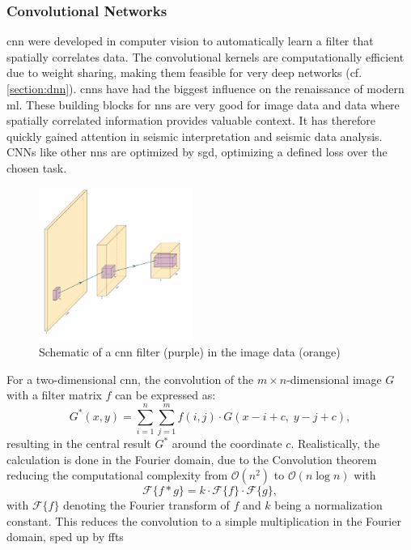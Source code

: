 \subsubsection{Convolutional Networks}
\label{section:cnn}
\acf{cnn} were developed in computer vision to automatically learn a filter that spatially correlates data. The convolutional kernels are computationally efficient due to weight sharing, making them feasible for very deep networks (cf. \cref{section:dnn}). \acp{cnn} have had the biggest influence on the renaissance of modern \ac{ml}. These building blocks for \acp{nn} are very good for image data and data where spatially correlated information provides valuable context. It has therefore quickly gained attention in seismic interpretation and seismic data analysis. CNNs like other \acp{nn} are optimized by \ac{sgd}, optimizing a defined loss over the chosen task.

\begin{figure}[H]
    \centering
    \includegraphics[width=\textwidth,height=5cm,keepaspectratio]{figures/cnn_schema.pdf}
    \caption{Schematic of a \ac{cnn} filter (purple) in the image data (orange)}
    \label{fig:cnn}
\end{figure}

For a two-dimensional \ac{cnn}, the convolution of the $m\times n$-dimensional image $G$ with a filter matrix $f$ can be expressed as:
\begin{equation}
G^{*}(x,y) = \sum_{i=1}^{n} \sum_{j=1}^{m} f(i,j)\cdot G(x-i+c,\; y-j+c),
\end{equation}
resulting in the central result $G^{*}$ around the coordinate $c$. Realistically, the calculation is done in the Fourier domain, due to the Convolution theorem reducing the computational complexity from $\mathcal{O}(n^2)$ to $\mathcal{O}(n \log n)$ with
\begin{equation}
    \mathcal{F}\{f * g\} = k\cdot \mathcal{F}\{f\}\cdot \mathcal{F}\{g\},
\end{equation}
with $\mathcal{F} \{ f\}$ denoting the Fourier transform of $f$ and $k$ being a normalization constant. This reduces the convolution to a simple multiplication in the Fourier domain, sped up by \acp{fft}

